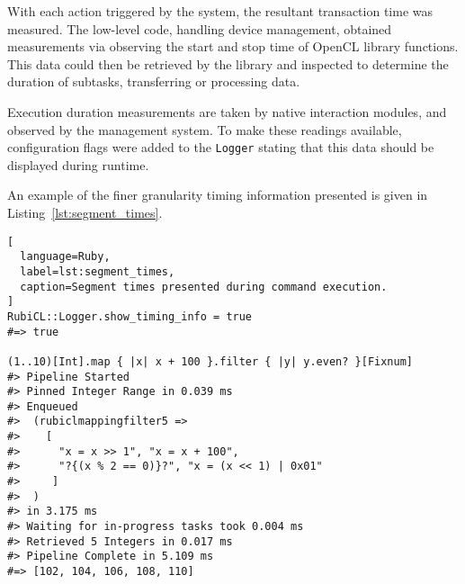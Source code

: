 With each action triggered by the system, the resultant transaction time was measured.
The low-level code, handling device management, obtained measurements via observing the start and stop time of \ac{OpenCL} library functions.
This data could then be retrieved by the library and inspected to determine the duration of subtasks, transferring or processing data.

Execution duration measurements are taken by native interaction modules, and observed by the management system.
To make these readings available, configuration flags were added to the \verb|Logger| stating that this data should be displayed during runtime.

An example of the finer granularity timing information presented is given in Listing~\ref{lst:segment_times}.
\begin{lstlisting}[
  language=Ruby,
  label=lst:segment_times,
  caption=Segment times presented during command execution.
]
RubiCL::Logger.show_timing_info = true
#=> true

(1..10)[Int].map { |x| x + 100 }.filter { |y| y.even? }[Fixnum]
#> Pipeline Started
#> Pinned Integer Range in 0.039 ms
#> Enqueued
#>  (rubiclmappingfilter5 =>
#>    [
#>      "x = x >> 1", "x = x + 100",
#>      "?{(x % 2 == 0)}?", "x = (x << 1) | 0x01"
#>     ]
#>  )
#> in 3.175 ms
#> Waiting for in-progress tasks took 0.004 ms
#> Retrieved 5 Integers in 0.017 ms
#> Pipeline Complete in 5.109 ms
#=> [102, 104, 106, 108, 110]

\end{lstlisting}

